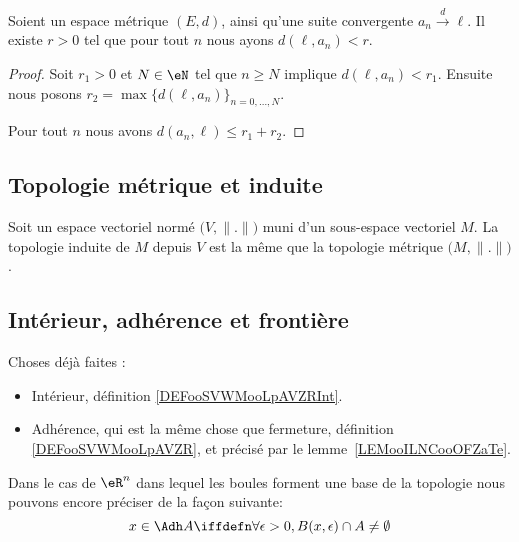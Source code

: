 \begin{proposition}      \label{PROPooUXDJooCrWBbd}
	Soient un espace métrique \( (E,d)\), ainsi qu'une suite convergente \( a_n\stackrel{d}{\longrightarrow}\ell\). Il existe \( r>0\) tel que pour tout \( n\) nous ayons \( d(\ell, a_n)<r\).
\end{proposition}

\begin{proof}
	Soit \( r_1>0\) et \( N\in \eN\) tel que \( n\geq N\) implique \( d(\ell,a_n)<r_1\). Ensuite nous posons \( r_2=\max\{ d(\ell,a_n) \}_{n=0,\ldots, N}\).

	Pour tout \( n\) nous avons \( d(a_n,\ell)\leq r_1+r_2\).
\end{proof}

\subsection{Topologie métrique et induite}

\begin{lemma}       \label{LEMooKDMYooMIcFRI}
	Soit un espace vectoriel normé \( \big( V,\| . \| \big)   \) muni d'un sous-espace vectoriel \( M\). La topologie induite de \( M\) depuis \( V\) est la même que la topologie métrique \( \big( M,\| . \| \big)\).
\end{lemma}

\subsection{Intérieur, adhérence et frontière}

\begin{normaltext}
	Choses déjà faites :
	\begin{itemize}
		\item
		      Intérieur, définition \ref{DEFooSVWMooLpAVZRInt}.
		\item
		      Adhérence, qui est la même chose que fermeture, définition \ref{DEFooSVWMooLpAVZR}, et précisé par le lemme~\ref{LEMooILNCooOFZaTe}.
	\end{itemize}

	Dans le cas de \( \eR^n\) dans lequel les boules forment une base de la topologie nous pouvons encore préciser de la façon suivante:
	\begin{equation}
		x \in \Adh A \iffdefn \forall \epsilon > 0, B(x,\epsilon) \cap A \neq \emptyset
	\end{equation}
\end{normaltext}

